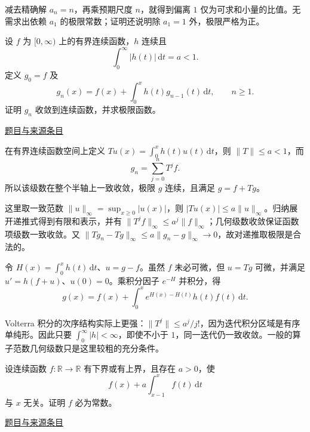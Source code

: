 \documentclass[12pt,fontset=fandol]{ctexart}
\begin{document}
\begin{remark}[方法与条件]减去精确解 $a_n=n$，再乘预期尺度 $n$，就得到偏离 $1$ 仅为可求和小量的比值。无需求出依赖 $a_1$ 的极限常数；证明还说明除 $a_1=1$ 外，极限严格为正。\end{remark}

\begin{example}[来源序号5]\label{ex:pre07-math:5}\label{pr:pre07-math:5}

设 $f$ 为 $[0,\infty)$ 上的有界连续函数，$h$ 连续且
\[
\int_0^\infty|h(t)|\,\mathrm dt=a<1.
\]
定义 $g_0=f$ 及
\[
g_n(x)=f(x)+\int_0^xh(t)g_{n-1}(t)\,\mathrm dt,\qquad n\ge1.
\]
证明 $g_n$ 收敛到连续函数，并求极限函数。

\par\href{https://github.com/lzxcr/cmc-mathematics/blob/64916fa1fdbc3e444a652eca204d5669058ee321/src/problems/preliminary/07/05.md}{题目与来源条目}

\end{example}

\begin{solve}\label{ans:pre07-math:5}

在有界连续函数空间上定义 $Tu(x)=\int_0^xh(t)u(t)\,\mathrm dt$，则 $\|T\|\le a<1$，而
\[
g_n=\sum_{j=0}^nT^jf.
\]
所以该级数在整个半轴上一致收敛，极限 $g$ 连续，且满足 $g=f+Tg$。

这里取一致范数 $\|u\|_\infty=\sup_{x\ge0}|u(x)|$，则 $|Tu(x)|\le a\|u\|_\infty$。归纳展开递推式得到有限和表示，并有 $\|T^jf\|_\infty\le a^j\|f\|_\infty$；几何级数收敛保证函数项级数一致收敛。又 $\|Tg_n-Tg\|_\infty\le a\|g_n-g\|_\infty\to0$，故对递推取极限是合法的。

令 $H(x)=\int_0^xh(t)\,\mathrm dt$、$u=g-f$。虽然 $f$ 未必可微，但 $u=Tg$ 可微，并满足 $u'=h(f+u)$、$u(0)=0$。乘积分因子 $e^{-H}$ 并积分，得
\[
\boxed{g(x)=f(x)+\int_0^xe^{H(x)-H(t)}h(t)f(t)\,\mathrm dt}.
\]

\end{solve}

\begin{remark}[方法与条件]Volterra 积分的次序结构实际上更强：$\|T^j\|\le a^j/j!$，因为迭代积分区域是有序单纯形。因此只要 $\int_0^\infty|h|<\infty$，即使不小于 $1$，同一迭代仍一致收敛。一般的算子范数几何级数只是这里较粗的充分条件。\end{remark}

\begin{example}[来源序号6]\label{ex:pre07-math:6}\label{pr:pre07-math:6}

设连续函数 $f:\mathbb R\to\mathbb R$ 有下界或有上界，且存在 $a>0$，使
\[
f(x)+a\int_{x-1}^xf(t)\,\mathrm dt
\]
与 $x$ 无关。证明 $f$ 必为常数。

\par\href{https://github.com/lzxcr/cmc-mathematics/blob/64916fa1fdbc3e444a652eca204d5669058ee321/src/problems/preliminary/07/06.md}{题目与来源条目}

\end{example}
\end{document}
